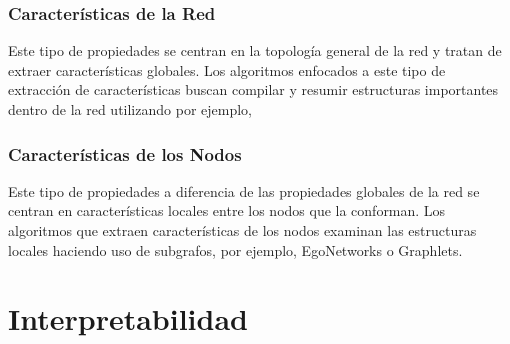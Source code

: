 \subsubsection{Características de la Red}
Este tipo de propiedades se centran en la topología general de la red y tratan de extraer características globales. Los algoritmos enfocados a este tipo de extracción de características buscan compilar y resumir estructuras importantes dentro de la red utilizando por ejemplo,

\begin{comment}
    \begin{center}
    \begin{tabular}{ |p{8cm}|p{2cm}|  }
    \hline
    \multicolumn{2}{|c|}{Graph Embedding} \\
    \hline
    Paper & Algoritmo \\
    \hline
    “Graph2Vec: Learning Distributed Representations of Graphs” & Graph2Vec  \\
    \hline
    “Hunt For The Unique, Stable, Sparse And Fast Feature Learning On Graphs” & FGSD \\
    \hline
    “A Simple Baseline Algorithm for Graph Classification” & SF \\
    \hline
    “NetLSD: Hearing the Shape of a Graph” & NetLSD \\
    \hline
    “GL2vec: Graph Embedding Enriched by Line Graphs with Edge Features” & GL2Vec \\
    \hline
    “Geometric Scattering for Graph Data Analysis” & GeoScattering \\
    \hline
    “Invariant Embedding for Graph Classification” & IGE \\
    \hline
    \end{tabular}
    \end{center}
\end{comment}

\subsubsection{Características de los Nodos} Este tipo de propiedades a diferencia de las propiedades globales de la red se centran en características locales entre los nodos que la conforman. Los algoritmos que extraen características de los nodos examinan las estructuras locales haciendo uso de subgrafos, por ejemplo, EgoNetworks o Graphlets.

\section{Interpretabilidad}

